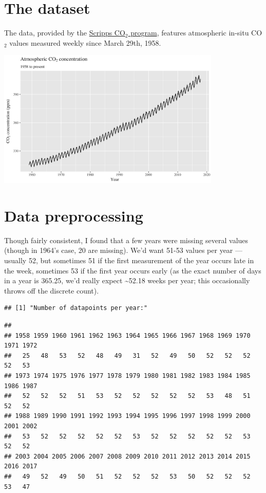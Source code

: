 \documentclass[]{article}
\let\origfigure=\figure
\let\endorigfigure=\endfigure
\renewenvironment{figure}[1][]{%
  \origfigure[H]
}{%
  \endorigfigure
}
\begin{document}
\vskip 6.5pt


\noindent  \hypertarget{the-dataset}{%
\section{The dataset}\label{the-dataset}}

The data, provided by the
\href{http://scrippsco2.ucsd.edu/data/atmospheric_co2/}{Scripps CO\(_2\)
program}, features atmospheric in-situ CO\(_2\) values measured weekly
since March 29th, 1958.

\begin{figure}
\centering
\includegraphics[width=0.8\textwidth]{mauna_loa/original_data.png}
\caption{Original data}
\end{figure}

\hypertarget{data-preprocessing}{%
\section{Data preprocessing}\label{data-preprocessing}}

Though fairly consistent, I found that a few years were missing several
values (though in 1964's case, 20 are missing). We'd want 51-53 values
per year --- usually 52, but sometimes 51 if the first measurement of
the year occurs late in the week, sometimes 53 if the first year occurs
early (as the exact number of days in a year is 365.25, we'd really
expect \textasciitilde{}52.18 weeks per year; this occasionally throws
off the discrete count). \newline

\begin{verbatim}
## [1] "Number of datapoints per year:"
\end{verbatim}

\begin{verbatim}
## 
## 1958 1959 1960 1961 1962 1963 1964 1965 1966 1967 1968 1969 1970 1971 1972 
##   25   48   53   52   48   49   31   52   49   50   52   52   52   52   53 
## 1973 1974 1975 1976 1977 1978 1979 1980 1981 1982 1983 1984 1985 1986 1987 
##   52   52   52   51   53   52   52   52   52   52   53   48   51   52   52 
## 1988 1989 1990 1991 1992 1993 1994 1995 1996 1997 1998 1999 2000 2001 2002 
##   53   52   52   52   52   52   53   52   52   52   52   52   53   52   52 
## 2003 2004 2005 2006 2007 2008 2009 2010 2011 2012 2013 2014 2015 2016 2017 
##   49   52   49   50   51   52   52   52   53   50   52   52   52   53   47
\end{verbatim}
\end{document}
